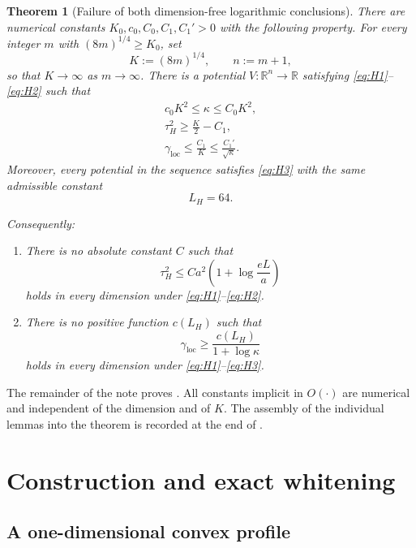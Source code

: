 \documentclass[11pt]{article}
\theoremstyle{plain}
\newtheorem{theorem}{Theorem}[section]
\theoremstyle{definition}
\theoremstyle{remark}
\newcommand{\R}{\mathbb{R}}
\newcommand{\1}{\mathbf{1}}
\begin{document}
\begin{theorem}[Failure of both dimension-free logarithmic conclusions]
\label{thm:main}
There are numerical constants $K_0,c_0,C_0,C_1,C_1'>0$ with the following
property. For every integer $m$ with $(8m)^{1/4}\geq K_0$, set
\[
    K:=(8m)^{1/4},
    \qquad
    n:=m+1,
\]
so that $K\to\infty$ as $m\to\infty$. There is a potential $V:\R^n\to\R$
satisfying \eqref{eq:H1}--\eqref{eq:H2} such that
\begin{align}
    c_0K^2
    \leq
    \kappa
    \leq
    C_0K^2,
    \label{eq:kappa-main}\\
    \tau_H^2
    \geq
    \frac{K}{2}-C_1,
    \label{eq:tau-main}\\
    \gamma_{\mathrm{loc}}
    \leq
    \frac{C_1}{K}
    \leq
    \frac{C_1'}{\sqrt\kappa}.
    \label{eq:gap-main}
\end{align}
Moreover, every potential in the sequence satisfies \eqref{eq:H3} with the
same admissible constant
\[
    L_H=64.
\]

Consequently:

\begin{enumerate}
\item There is no absolute constant $C$ such that
\[
    \tau_H^2
    \leq
    C a^2\left(1+\log\frac{eL}{a}\right)
\]
holds in every dimension under \eqref{eq:H1}--\eqref{eq:H2}.

\item There is no positive function $c(L_H)$ such that
\[
    \gamma_{\mathrm{loc}}
    \geq
    \frac{c(L_H)}{1+\log\kappa}
\]
holds in every dimension under \eqref{eq:H1}--\eqref{eq:H3}.
\end{enumerate}
\end{theorem}

The remainder of the note proves . All constants implicit in
$O(\cdot)$ are numerical and independent of the dimension and of $K$. The
assembly of the individual lemmas into the theorem is recorded at the end of
.

\section{Construction and exact whitening}

\subsection{A one-dimensional convex profile}
\end{document}
